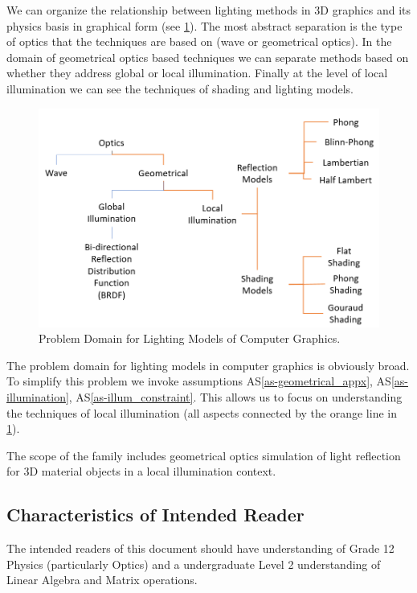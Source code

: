 \documentclass[12pt]{article}
\newcommand{\aSref}[1]{AS\ref{#1}}
\begin{document}
We can organize the relationship between lighting methods in 3D graphics and 
its physics basis in graphical form (see \ref{fig:prob-domain-analysis}). The 
most abstract separation is the type of optics that the techniques are based on 
(wave or geometrical optics). In the domain of geometrical optics based 
techniques we can separate methods based on whether they address global or 
local illumination. Finally at the level of local illumination we can see the 
techniques of shading and lighting models.

\begin{figure}[h]
	\centering
	\includegraphics[scale=0.5]{./images/problem-domain-analysis}
	\caption{Problem Domain for Lighting Models of Computer Graphics.}
	\label{fig:prob-domain-analysis}
\end{figure}

The problem domain for lighting models in computer graphics is obviously broad. 
To simplify this problem we invoke assumptions \aSref{as-geometrical_appx}, 
\aSref{as-illumination}, \aSref{as-illum_constraint}. This allows us to focus 
on understanding the techniques of local illumination (all aspects connected by 
the orange line in \ref{fig:prob-domain-analysis}).

The scope of the family includes geometrical optics simulation of light 
reflection for 3D material objects in a local illumination context.

\subsection{Characteristics of Intended Reader}
The intended readers of this document should have understanding of Grade 12 
Physics (particularly Optics) and a undergraduate Level 2 understanding of 
Linear Algebra and Matrix operations.  
\end{document}
